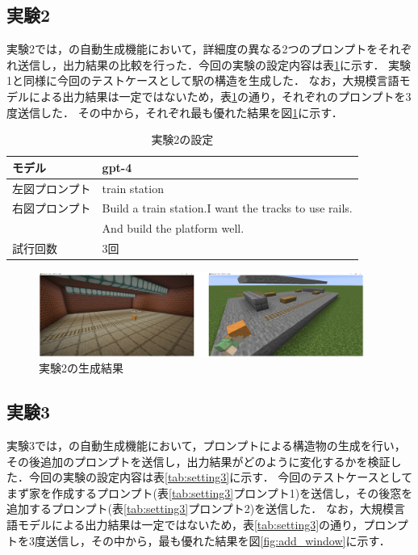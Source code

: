 \subsection{実験2}\label{sec:ex2}
実験2では，{\mason}の自動生成機能において，詳細度の異なる2つのプロンプトをそれぞれ送信し，出力結果の比較を行った．今回の実験の設定内容は表\ref{tab:setting2}に示す．
実験1と同様に今回のテストケースとして駅の構造を生成した．
なお，大規模言語モデルによる出力結果は一定ではないため，表\ref{tab:setting2}の通り，それぞれのプロンプトを3度送信した．
その中から，それぞれ最も優れた結果を図\ref{fig:station2}に示す．
\begin{table}[H]
    \caption{実験2の設定}\label{tab:setting2}
    \centering
    \begin{tabular}{ll}
        \hline \hline
        モデル & gpt-4 \\
        \hline
        左図プロンプト & train station \\
        \hline
        右図プロンプト & Build a train station.I want the tracks to use rails. \\
        　 & And build the platform well. \\
        \hline
        試行回数 & 3回 \\
        \hline
    \end{tabular}
\end{table}

\begin{figure}[H]
    \centering
    \includegraphics[width=0.95\textwidth]{fig/train_station2.PNG}
    \caption{実験2の生成結果}
    \label{fig:station2}
\end{figure}

\subsection{実験3}\label{sec:ex3}
実験3では，{\mason}の自動生成機能において，プロンプトによる構造物の生成を行い，その後追加のプロンプトを送信し，出力結果がどのように変化するかを検証した．今回の実験の設定内容は表\ref{tab:setting3}に示す．
今回のテストケースとしてまず家を作成するプロンプト(表\ref{tab:setting3}プロンプト1)を送信し，その後窓を追加するプロンプト(表\ref{tab:setting3}プロンプト2)を送信した．
なお，大規模言語モデルによる出力結果は一定ではないため，表\ref{tab:setting3}の通り，プロンプトを3度送信し，その中から，最も優れた結果を図\ref{fig:add_window}に示す．

